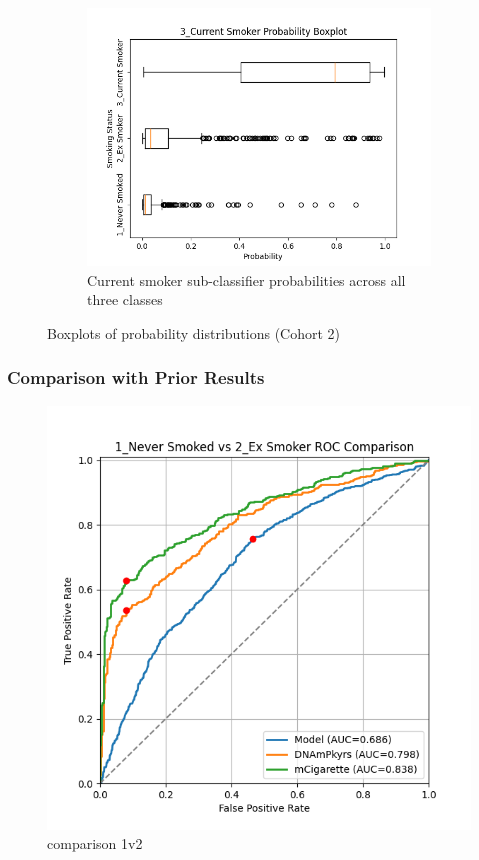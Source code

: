 \documentclass{article}
\begin{document}
\begin{figure}
    \begin{subfigure}{0.48\textwidth}
        \centering
        \includegraphics[width=\linewidth]{cohort2_3_boxplot.png}
        \caption{Current smoker sub-classifier probabilities across all three classes}
    \end{subfigure}
    \caption{Boxplots of probability distributions (Cohort 2)}
\end{figure}

\subsubsection{Comparison with Prior Results}

\begin{figure}
    \centering
    \includegraphics[width=\linewidth]{comparison_1v2_roc.png}
    \caption{comparison 1v2}
\end{figure}
\end{document}
